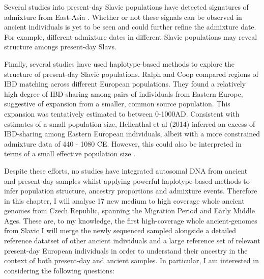 Several studies into present-day Slavic populations have detected signatures of admixture from East-Asia \cite{Hellenthal2014, pankratov2016east, MOSAIC_2019, maliarchuk2008origin, qin2015quantitating}. Whether or not these signals can be observed in ancient individuals is yet to be seen and could further refine the admixture date. For example, different admixture dates in different Slavic populations may reveal structure amongs present-day Slavs. 

Finally, several studies have used haplotype-based methods to explore the structure of present-day Slavic populations. Ralph and Coop \cite{RalphCoop2013} compared regions of IBD matching  across different European populations. They found a relatively high degree of IBD sharing among pairs of individuals from Eastern Europe, suggestive of expansion from a smaller, common source population. This expansion was tentatively estimated to between 0-1000AD. Consistent with estimates of a small population size, Hellenthal et al (2014) \cite{Hellenthal2014} inferred an excess of IBD-sharing among Eastern European individuals, albeit with a more constrained admixture data of 440 - 1080 CE. However, this could also be interpreted in terms of a small effective population size \cite{al2019estimating, ringbauer2017inferring}. 

Despite these efforts, no studies have integrated autosomal DNA from ancient and present-day samples whilst applying powerful haplotype-based methods to infer population structure, ancestry proportions and admixture events. Therefore in this chapter, I will analyse 17 new medium to high coverage whole ancient genomes from Czech Republic, spanning the Migration Period and Early Middle Ages. These are, to my knowledge, the first high-coverage whole ancient-genomes from Slavic I will merge the newly sequenced sampled alongside a detailed reference datatset of other ancient individuals and a large reference set of relevant present-day European individuals in order to understand their ancestry in the context of both present-day and ancient samples. In particular, I am interested in considering the following questions:

